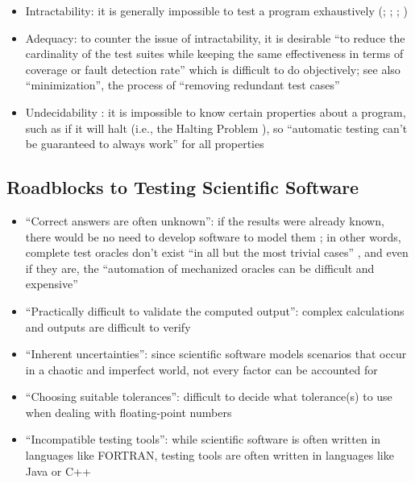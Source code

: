 \begin{itemize}
    \item Intractability: it is generally impossible to test a program
          exhaustively (\citealp[p.~4]{IEEE2022}; \citealp[p.~5-5]{SWEBOK2024};
          \citealp[pp.~439, 461]{PetersAndPedrycz2000}; \citealp[p.~421]{vanVliet2000})
    \item Adequacy: to counter the issue of intractability, it is desirable
          ``to reduce the cardinality of the test suites while keeping the
          same effectiveness in terms of coverage or fault detection rate''
          \citep[p.~5-4]{SWEBOK2024} which is difficult to do objectively;
          see also ``minimization'', the process of ``removing redundant test
          cases'' \citep[p.~5-4]{SWEBOK2024}
    \item Undecidability \citep[p.~439]{PetersAndPedrycz2000}: it is
          impossible to know certain properties about a program, such as if
          it will halt (i.e., the Halting Problem
          \citep[p.~4]{gurfinkel_testing_2017}), so ``automatic testing
          can't be guaranteed to always work'' for all properties
          \citep{nelson_formal_1999} 
\end{itemize}

\subsection[Roadblocks to Testing Scientific Software]
{Roadblocks to Testing Scientific Software
    \citep[p.~67]{KanewalaAndYuehChen2019}}
\label{chap:testing:sec:sci-testing-roadblocks}
\begin{itemize}
    \item ``Correct answers are often unknown'': if the results were already
          known, there would be no need to develop software to model them
          \citep[p.~67]{KanewalaAndYuehChen2019}; in other words, complete
          test oracles don't exist ``in all but the most trivial cases''
          \citep[p.~510]{BarrEtAl2015}, and even if they are, the
          ``automation of mechanized oracles can be difficult and expensive''
          \citep[p.~5.5]{SWEBOK2024}
    \item ``Practically difficult to validate the computed output'': complex
          calculations and outputs are difficult to verify
          \citep[p.~67]{KanewalaAndYuehChen2019}
    \item ``Inherent uncertainties'': since scientific software models
          scenarios that occur in a chaotic and imperfect world, not every
          factor can be accounted for \citep[p.~67]{KanewalaAndYuehChen2019}
    \item ``Choosing suitable tolerances'': difficult to decide what
          tolerance(s) to use when dealing with floating-point numbers
          \citep[p.~67]{KanewalaAndYuehChen2019}
    \item ``Incompatible testing tools'': while scientific software is often
          written in languages like FORTRAN, testing tools are often written
          in languages like Java or C++ \citep[p.~67]{KanewalaAndYuehChen2019}
\end{itemize}

